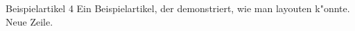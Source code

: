 \begin{artikel}{Beispielartikel 4}
\vspace{-0.5cm}
Ein Beispielartikel, der demonstriert, wie man layouten k"onnte.\\

Neue Zeile.
\end{artikel}
